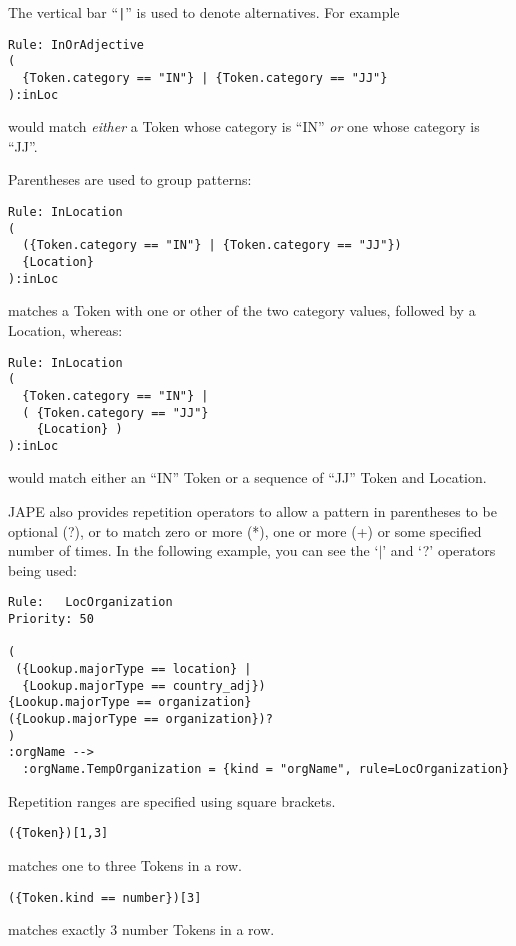 The vertical bar ``\verb!|!'' is used to denote alternatives.  For example
\begin{small}
\begin{verbatim}
Rule: InOrAdjective
(
  {Token.category == "IN"} | {Token.category == "JJ"}
):inLoc
\end{verbatim}
\end{small}
would match {\em either} a Token whose category is ``IN'' {\em or} one whose
category is ``JJ''.

Parentheses are used to group patterns:
\begin{small}
\begin{verbatim}
Rule: InLocation
(
  ({Token.category == "IN"} | {Token.category == "JJ"})
  {Location}
):inLoc
\end{verbatim}
\end{small}
matches a Token with one or other of the two category values, followed by a
Location, whereas:
\begin{small}
\begin{verbatim}
Rule: InLocation
(
  {Token.category == "IN"} |
  ( {Token.category == "JJ"}
    {Location} )
):inLoc
\end{verbatim}
\end{small}
would match either an ``IN'' Token or a sequence of ``JJ'' Token and Location.


JAPE also provides repetition operators to allow a pattern in parentheses to be
optional (?), or to match zero or more (*), one or more (+) or some specified
number of times.  In the following example, you can see the `$\mid $' and `?'
operators being used: 
\begin{small}
\begin{verbatim}
Rule:	LocOrganization
Priority: 50

(
 ({Lookup.majorType == location} |
  {Lookup.majorType == country_adj})
{Lookup.majorType == organization}
({Lookup.majorType == organization})?
)
:orgName -->  
  :orgName.TempOrganization = {kind = "orgName", rule=LocOrganization}
\end{verbatim}
\end{small}


Repetition ranges are specified using square brackets.
\begin{small}
\begin{verbatim}({Token})[1,3]\end{verbatim}
\end{small} matches one to three Tokens 
in a row. \begin{small}
\begin{verbatim}({Token.kind == number})[3]\end{verbatim}
\end{small} matches
exactly 3 number Tokens in a row.

